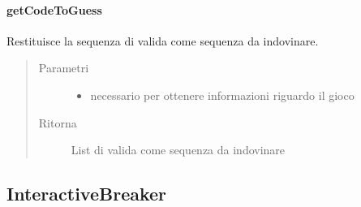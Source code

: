 \documentclass[letterpaper,10pt,italian]{sphinxmanual}
\begin{document}
\paragraph{getCodeToGuess}
\label{\detokenize{source/it/unicam/cs/pa/mastermind/players/CodeMaker:getcodetoguess}}

\begin{fulllineitems}
\label{\detokenize{source/it/unicam/cs/pa/mastermind/players/CodeMaker:it.unicam.cs.pa.mastermind.players.CodeMaker.getCodeToGuess(InteractionView)}}
Restituisce la sequenza di  valida come sequenza da indovinare.
\begin{quote}\begin{description}
\item[{Parametri}] \leavevmode\begin{itemize}
\item {} 
 \textendash{} necessario per ottenere informazioni riguardo il gioco

\end{itemize}

\item[{Ritorna}] \leavevmode
List di  valida come sequenza da indovinare

\end{description}\end{quote}

\end{fulllineitems}



\subsection{InteractiveBreaker}
\label{\detokenize{source/it/unicam/cs/pa/mastermind/players/InteractiveBreaker:interactivebreaker}}\label{\detokenize{source/it/unicam/cs/pa/mastermind/players/InteractiveBreaker::doc}}
\end{document}
